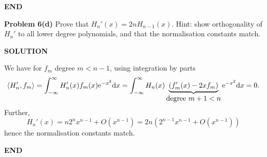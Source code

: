 \documentclass[12pt,a4paper]{article}
\begin{document}
\textbf{END}

\textbf{Problem 6(d)} Prove that $H_n'(x) = 2n H_{n-1}(x)$. Hint: show orthogonality of $H_n'$ to all lower degree polynomials, and that the normalisation constants match.

\textbf{SOLUTION}

We have for $f_m$ degree $m < n-1$, using integration by parts
\[
\ensuremath{\langle}H_n', f_m\ensuremath{\rangle} = \ensuremath{\int}_{-\ensuremath{\infty}}^\ensuremath{\infty} H_n'(x) f_m(x) {\rm e}^{-x^2} {\rm d} x =  \ensuremath{\int}_{-\ensuremath{\infty}}^\ensuremath{\infty} H_n(x) \underbrace{(f_m'(x) -2x f_m)}_{\hbox{degree $m+1 < n$}}  {\rm e}^{-x^2} {\rm d} x = 0.
\]
Further,
\[
H_n'(x) = n 2^n x^{n-1} + O(x^{n-1}) = 2n (2^{n-1} x^{n-1} + O(x^{n-1}))
\]
hence the normalisation constants match.

\textbf{END}
\end{document}
